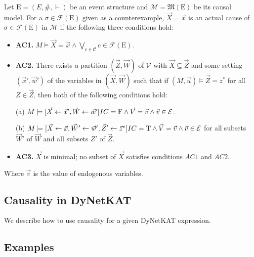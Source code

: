 \begin{definition}
    Let $\mathrm{E} = (E,\#,\vdash)$ be an event structure and
    $\mathcal{M} = \mathfrak{M}(\mathrm{E})$ be its causal model.
    For a $\sigma \in \mathcal{F}(\mathrm{E})$ given as a counterexample,
    $\vec X = \vec x$ is an actual cause of
    $\sigma \in \mathcal{F}(\mathrm{E})$ in $\mathcal{M}$ if the following three conditions hold:
    \begin{itemize}
        \item  \textbf{AC1.} $M\models \vec X = \vec x
                  \wedge \bigvee_{c \in \mathcal{C}}c \in \mathcal{F}(\mathrm{E})$.
        \item  \textbf{AC2. }There exists a partition $(\vec Z, \vec W)$ of $\mathcal{V}$ with $\vec X \subseteq \vec Z$ and some setting $(\vec x',\vec w')$ of the variables in $(\vec X,\vec W)$ such that if $(M,\vec u)\models \vec Z = z^*$ for all $Z\in \vec Z$, then both of the following conditions hold:

              (a) $M \models[\vec X \leftarrow \vec x', \vec W \leftarrow \vec w']
                  IC = \mathrm{F}
                  \wedge \vec V = \vec v
                  \wedge  \vec v \in \mathcal{E}$.

              (b) $M \models[\vec X\leftarrow \vec x, \vec W' \leftarrow \vec w', \vec Z'\leftarrow \vec z^*]
                  IC = \mathrm{T}
                  \wedge \vec V = \vec v
                  \wedge \vec v \in \mathcal{E}$
              for all subsets $\vec W'$ of $\vec W$ and all subsets $Z'$ of $\vec Z$.

        \item  \textbf{AC3.} $\vec X$ is minimal; no subset of $\vec X$ satisfies conditions $AC1$ and $AC2$.
    \end{itemize}
    Where $\vec v$ is the value of endogenous variables.
\end{definition}
\pagebreak

\subsection{Causality in DyNetKAT}
We describe how to use causality for a given DyNetKAT expression.

\begin{definition}
    
\end{definition}


\subsection{Examples}
